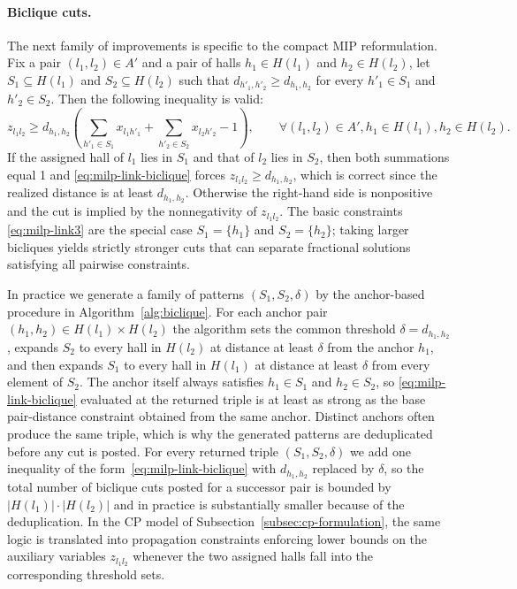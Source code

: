 \documentclass[11pt]{article}
\begin{document}
\paragraph{Biclique cuts.}
The next family of improvements is specific to the compact MIP reformulation. Fix a pair $(l_1,l_2) \in A'$  and  a pair of halls  $h_1 \in H(l_1)$ and $h_2 \in H(l_2)$, let $S_1 \subseteq H(l_1)$ and $S_2 \subseteq H(l_2)$  such that $d_{h'_1,h'_2} \ge d_{h_1,h_2} $ for every $h'_1 \in S_1$ and $h'_2 \in S_2$. Then the following inequality is valid:
\begin{equation}
    z_{l_1 l_2} \ge d_{h_1,h_2}\!\left(\sum_{h'_1 \in S_1} x_{l_1 h'_1} + \sum_{h'_2 \in S_2} x_{l_2 h'_2} - 1\right),
    \qquad \forall (l_1,l_2) \in A', h_1 \in H(l_1), h_2  \in H(l_2) .
    \label{eq:milp-link-biclique}
\end{equation}
If the assigned hall of $l_1$ lies in $S_1$ and that of $l_2$ lies in $S_2$, then both summations equal 1 and \eqref{eq:milp-link-biclique} forces $z_{l_1 l_2} \ge d_{h_1,h_2}$, which is correct since the realized distance is at least $d_{h_1,h_2}$. Otherwise the right-hand side is nonpositive and the cut is implied by the nonnegativity of $z_{l_1 l_2}$. The basic constraints \eqref{eq:milp-link3} are the special case $S_1 = \{h_1\}$ and $S_2 = \{h_2\}$; taking larger bicliques yields strictly stronger cuts that can separate fractional solutions satisfying all pairwise constraints.

In practice we generate a family of patterns $(S_1, S_2, \delta)$ by the anchor-based procedure in Algorithm~\ref{alg:biclique}. For each anchor pair $(h_1,h_2) \in H(l_1) \times H(l_2)$ the algorithm sets the common threshold $\delta = d_{h_1,h_2}$, expands $S_2$ to every hall in $H(l_2)$ at distance at least $\delta$ from the anchor $h_1$, and then expands $S_1$ to every hall in $H(l_1)$ at distance at least $\delta$ from every element of $S_2$. The anchor itself always satisfies $h_1 \in S_1$ and $h_2 \in S_2$, so \eqref{eq:milp-link-biclique} evaluated at the returned triple is at least as strong as the base pair-distance constraint obtained from the same anchor. Distinct anchors often produce the same triple, which is why the generated patterns are deduplicated before any cut is posted. For every returned triple $(S_1,S_2,\delta)$ we add one inequality of the form~\eqref{eq:milp-link-biclique} with $d_{h_1,h_2}$ replaced by $\delta$, so the total number of biclique cuts posted for a successor pair is bounded by $|H(l_1)| \cdot |H(l_2)|$ and in practice is substantially smaller because of the deduplication. In the CP model of Subsection~\ref{subsec:cp-formulation}, the same logic is translated into propagation constraints enforcing lower bounds on the auxiliary variables $z_{l_1 l_2}$ whenever the two assigned halls fall into the corresponding threshold sets.
\end{document}
